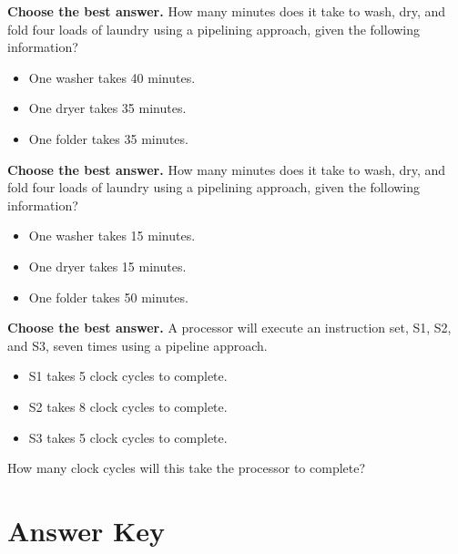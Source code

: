 \documentclass{exam}
\newenvironment{answer}
{%
  \global\setbox\allanswers=\vbox\bgroup %
  \unvbox\allanswers%
    \textbf{\thequestion.}  \thechoice\\
}%
{%
  \egroup%
}
\newcommand{\CC}{\CorrectChoice \leavevmode \begin{answer} \end{answer}}%
\newcommand{\showallanswers}{%
\ifprintanswers 
\newpage
\section*{Answer Key}
\CorrectChoiceEmphasis{\color{green} \bfseries}
\par \usebox\allanswers \fi}
\begin{document}
\begin{questions}
		\begin{choices}
			\CC 280
			\choice 460
		\end{choices}

\question \textbf{Choose the best answer.}
        How many minutes does it take to wash, dry, and fold four loads of laundry using a pipelining approach, given the following information?
        \begin{itemize}
            \item[] One washer takes 40 minutes.
            \item[] One dryer takes 35 minutes.
            \item[] One folder takes 35 minutes.
        \end{itemize}
        
		\begin{choices}
			\CC 230
			\choice 190
			\choice 440
			\choice 310
		\end{choices}

\question \textbf{Choose the best answer.}
        How many minutes does it take to wash, dry, and fold four loads of laundry using a pipelining approach, given the following information?
        \begin{itemize}
            \item[] One washer takes 15 minutes.
            \item[] One dryer takes 15 minutes.
            \item[] One folder takes 50 minutes.
        \end{itemize}
        
		\begin{choices}
			\CC 230
			\choice 280
			\choice 330
			\choice 180
		\end{choices}

\question \textbf{Choose the best answer.}
        A processor will execute an instruction set, S1, S2, and S3, seven times using a pipeline approach. 
        \begin{itemize}
            \item[] S1 takes 5 clock cycles to complete.
            \item[] S2 takes 8 clock cycles to complete.
            \item[] S3 takes 5 clock cycles to complete.
        \end{itemize}
        How many clock cycles will this take the processor to complete?
        
		\begin{choices}
			\CC 66
		\end{choices}
\end{questions}

\showallanswers
\end{document}
